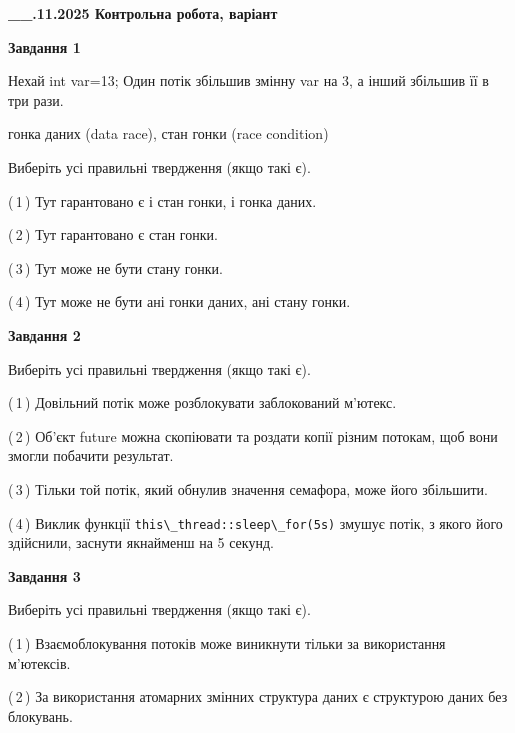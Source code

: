 \documentclass[12pt, ukrainian]{article}
\def\code#1{\Verb!#1!}
\begin{document}
\begin {large}

\textbf{\_\_.11.2025 Контрольна робота, варіант  }\par


{

\begin{center}
\textbf{Завдання 1}
\end{center}
Нехай int var=13; Один потік збільшив змінну var на 3, а інший збільшив її в три рази.

гонка даних (data race), стан гонки (race condition)

Виберіть усі правильні твердження (якщо такі є).\par
\vspace{2mm}
(\,1\,) Тут гарантовано є і стан гонки, і гонка даних.%

(\,2\,) Тут гарантовано є стан гонки.%

(\,3\,) Тут може не бути стану гонки.%

(\,4\,) Тут може не бути ані гонки даних, ані стану гонки.%



\begin{center}
\textbf{Завдання 2}
\end{center}
Виберіть усі правильні твердження (якщо такі є).\par
\vspace{2mm}

(\,1\,) Довільний потік може розблокувати заблокований м’ютекс.%

(\,2\,) Об’єкт future можна скопіювати та роздати копії різним потокам, щоб вони змогли побачити результат.%

(\,3\,) Тільки той потік, який обнулив значення семафора, може його збільшити.%

(\,4\,) Виклик функції \code{this\_thread::sleep\_for(5s)} змушує потік, з якого його здійснили, заснути якнайменш на 5 секунд.%



\begin{center}
\textbf{Завдання 3}
\end{center}
Виберіть усі правильні твердження (якщо такі є).\par
\vspace{2mm}

(\,1\,) Взаємоблокування потоків може виникнути тільки за використання м’ютексів.%

(\,2\,) За використання атомарних змінних структура даних є структурою даних без блокувань.%

}
\end{large}
\end{document}
